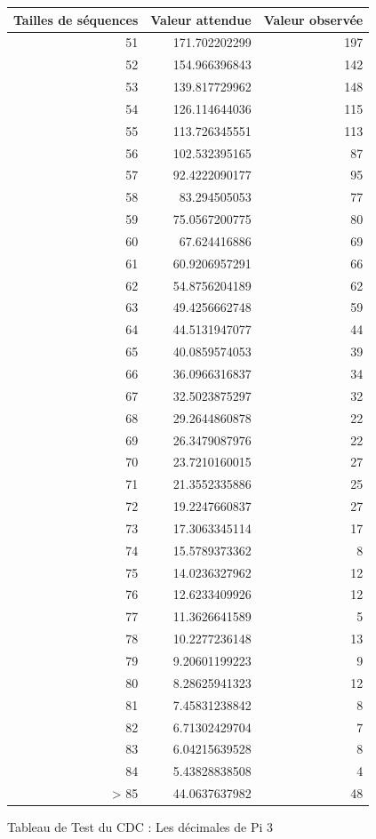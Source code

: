 \documentclass[10pt,a4paper]{article}
\begin{document}
\begin{figure}[h]
\centering
\begin{tabular}{|r|r|r|}
\hline
Tailles de séquences & Valeur attendue & Valeur observée\\
\hline
51 & 171.702202299 & 197\\
52 & 154.966396843 & 142\\
53 & 139.817729962 & 148\\
54 & 126.114644036 & 115\\
55 & 113.726345551 & 113\\
56 & 102.532395165 & 87\\
57 & 92.4222090177 & 95\\
58 & 83.294505053 & 77\\
59 & 75.0567200775 & 80\\
60 & 67.624416886 & 69\\
61 & 60.9206957291 & 66\\
62 & 54.8756204189 & 62\\
63 & 49.4256662748 & 59\\
64 & 44.5131947077 & 44\\
65 & 40.0859574053 & 39\\
66 & 36.0966316837 & 34\\
67 & 32.5023875297 & 32\\
68 & 29.2644860878 & 22\\
69 & 26.3479087976 & 22\\
70 & 23.7210160015 & 27\\
71 & 21.3552335886 & 25\\
72 & 19.2247660837 & 27\\
73 & 17.3063345114 & 17\\
74 & 15.5789373362 & 8\\
75 & 14.0236327962 & 12\\
76 & 12.6233409926 & 12\\
77 & 11.3626641589 & 5\\
78 & 10.2277236148 & 13\\
79 & 9.20601199223 & 9\\
80 & 8.28625941323 & 12\\
81 & 7.45831238842 & 8\\
82 & 6.71302429704 & 7\\
83 & 6.04215639528 & 8\\
84 & 5.43828838508 & 4\\
> 85 & 44.0637637982 & 48\\
\hline
\end{tabular}
\caption{Tableau de Test du CDC : Les décimales de Pi 3}
\end{figure}
\end{document}
